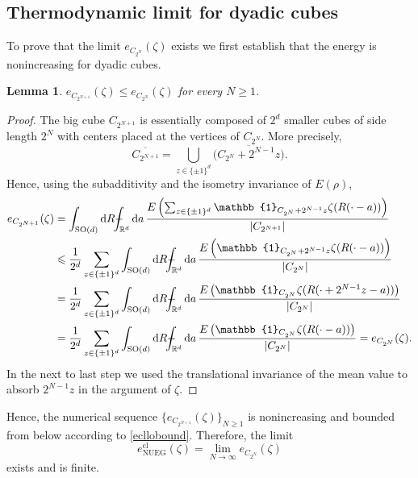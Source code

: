 \documentclass[final,onefignum,onetabnum,reqno]{amsart}
\newtheorem{lemma}[theorem]{Lemma}
\theoremstyle{remark}
\renewcommand{\le}{\leqslant}
\renewcommand{\ge}{\geqslant}
\newcommand{\ol}[1]{\overline{#1}}
\newcommand{\RR}{\mathbb{R}}
\newcommand{\SO}{\mathrm{SO}}
\newcommand{\cl}{\mathrm{cl}} %
\newcommand{\NUEG}{\mathrm{NUEG}} %
\newcommand{\iden}{\mathbb{1}} %
\newcommand{\dd}{\mathrm{d}} %
\def\Xint#1{\mathchoice
{\XXint\displaystyle\textstyle{#1}}%
{\XXint\textstyle\scriptstyle{#1}}%
{\XXint\scriptstyle\scriptscriptstyle{#1}}%
{\XXint\scriptscriptstyle\scriptscriptstyle{#1}}%
\!\int}
\def\XXint#1#2#3{{\setbox0=\hbox{$#1{#2#3}{\int}$ }
\vcenter{\hbox{$#2#3$ }}\kern-.6\wd0}}
\def\dashint{\Xint-}
\begin{document}
\subsection{Thermodynamic limit for dyadic cubes}
To prove that the limit $e_{C_{2^N}}(\zeta)$ exists we first establish that the energy is nonincreasing for dyadic cubes.
\begin{lemma}\label{dyadmono}
$e_{C_{2^{N+1}}}(\zeta)\le e_{C_{2^N}}(\zeta)$ for every $N\ge 1$.
\end{lemma}
\begin{proof}
The big cube $C_{2^{N+1}}$ is essentially composed of $2^d$ smaller cubes of side length $2^N$ with centers placed at the vertices of $C_{2^N}$. More precisely, 
$$
\ol{C_{2^{N+1}}}=\bigcup_{z\in\{\pm 1\}^d} \ol{\bigl(C_{2^N}+2^{N-1}z\bigr)}.
$$
Hence, using the subadditivity and the isometry invariance of $E(\rho)$,
\begin{align*}
e_{C_{2^{N+1}}}(\zeta)&=\int_{\SO(d)}\dd R \dashint_{\RR^d}\dd a\, \frac{E\left(\sum_{z\in\{\pm 1\}^d} \iden_{C_{2^N}+2^{N-1}z} \zeta(R(\cdot-a)) \right)}{|C_{2^{N+1}}|}\\
&\le \frac{1}{2^d} \sum_{z\in\{\pm 1\}^d}  \int_{\SO(d)}\dd R \dashint_{\RR^d}\dd a\, \frac{E\left(\iden_{C_{2^N}+2^{N-1}z} \zeta(R(\cdot-a)) \right)}{|C_{2^{N}}|}\\
&=\frac{1}{2^d}\sum_{z\in\{\pm 1\}^d} \int_{\SO(d)}\dd R \dashint_{\RR^d}\dd a\,  \frac{E\left(\iden_{C_{2^N}} \zeta(R(\cdot+2^{N-1}z-a)) \right)}{|C_{2^{N}}|}\\
&=\frac{1}{2^d}\sum_{z\in\{\pm 1\}^d} \int_{\SO(d)}\dd R \dashint_{\RR^d}\dd a\, \frac{E\left(\iden_{C_{2^N}} \zeta(R(\cdot-a)) \right)}{|C_{2^{N}}|}=e_{C_{2^N}}(\zeta).
\end{align*}
In the next to last step we used the translational invariance of the mean value
to absorb $2^{N-1}z$ in the argument of $\zeta$.
\end{proof}

Hence, the numerical sequence $\{e_{C_{2^{N+1}}}(\zeta)\}_{N\ge 1}$ is nonincreasing and bounded from below according to \cref{ecllobound}. 
Therefore, the limit
$$
e_\NUEG^\cl(\zeta)=\lim_{N\to\infty} e_{C_{2^{N}}}(\zeta)
$$
exists and is finite.

\end{document}
